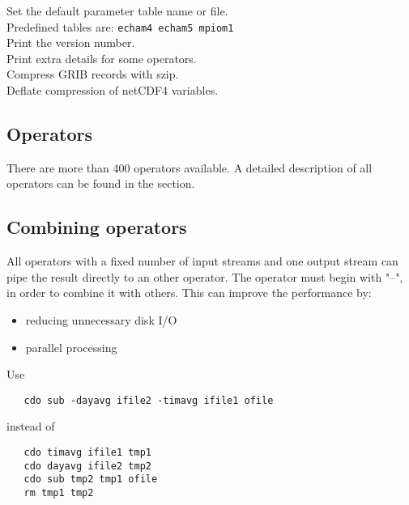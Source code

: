 \begin{tabbing}
         \> Set the default parameter table name or file.\\
         \> Predefined tables are:  {\tt echam4 echam5 mpiom1}\\
         \> Print the version number. \\
         \> Print extra details for some operators. \\
         \> Compress GRIB records with szip. \\
         \> Deflate compression of netCDF4 variables. \\
\end{tabbing}

\subsection{Operators}

There are more than 400 operators available.
A detailed description of all operators can be found in the
{\bf {}} section.


\subsection{Combining operators}

All operators with a fixed number of input streams and one output stream
can pipe the result directly to an other operator.
The operator must begin with "--", in order to combine it with others.
This can improve the performance by:
\begin{itemize}
\item reducing unnecessary disk I/O
\item parallel processing
\end{itemize}
Use
\begin{verbatim}
   cdo sub -dayavg ifile2 -timavg ifile1 ofile
\end{verbatim}
instead of
\begin{verbatim}
   cdo timavg ifile1 tmp1
   cdo dayavg ifile2 tmp2
   cdo sub tmp2 tmp1 ofile
   rm tmp1 tmp2
\end{verbatim}

